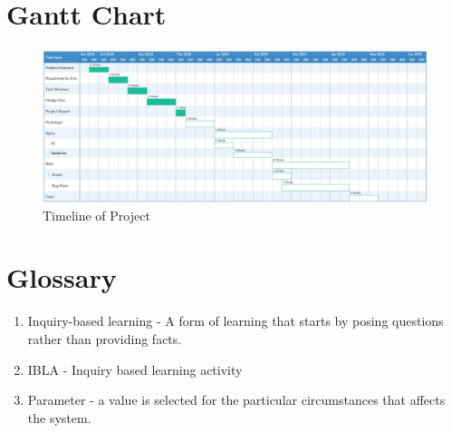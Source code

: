 \section{Gantt Chart}
\begin{figure}[H]
\includegraphics[width=\textwidth]{GanttChart1.png}
\caption{Timeline of Project}
\end{figure}

\section{Glossary}
\begin{enumerate}
    \item Inquiry-based learning - A form of learning that starts by posing questions rather than providing facts.
    \item IBLA - Inquiry based learning activity
    \item Parameter - a value is selected for the particular circumstances that affects the system. 

\end{enumerate}